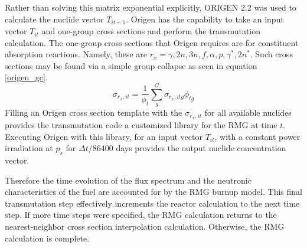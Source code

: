 Rather than solving this matrix exponential explicitly, ORIGEN 2.2 \cite{Croff2002} was used 
to calculate the nuclide vector $T_{it+1}$.  Origen has the capability to take an input vector 
$T_{it}$ and one-group cross sections and perform the transmutation calculation.  The one-group 
cross sections that Origen requires are for constituent absorption reactions.  Namely, these are 
$r_x = \gamma, 2n, 3n, f, \alpha, p, \gamma^*, 2n^*$.  Such cross sections may be found via 
a simple group collapse as seen in equation \ref{origen_gc}.
\begin{equation}
\label{origen_gc}
\sigma_{r_x,it} = \frac{1}{\phi_t} \sum_g^G \sigma_{r_x,itg} \phi_{tg}
\end{equation}
Filling an Origen cross section template with the $\sigma_{r_x,it}$ for all available nuclides
provides the transmutation code a customized library for the RMG at time $t$.  Executing Origen
with this library, for an input vector $T_{it}$, with a constant power irradiation at $p_s$ for
$\Delta t / 86400$ days provides the output nuclide concentration vector.

Therefore the
time evolution of the flux spectrum and the neutronic characteristics of the fuel are accounted
for by the RMG burnup model.  This final transmutation step effectively increments the reactor
calculation to the next time step.  If more time steps were specified, the RMG calculation returns
to the nearest-neighbor cross section interpolation calculation.  Otherwise, the RMG calculation is
complete.


